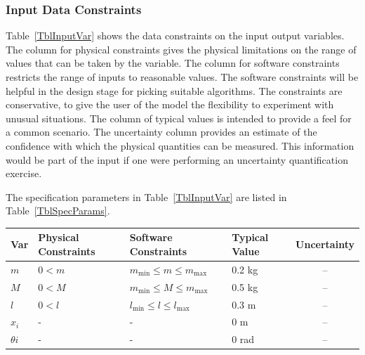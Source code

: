 \documentclass[12pt]{article}
\begin{document}



\subsubsection{Input Data Constraints} \label{sec_DataConstraints}    

Table~\ref{TblInputVar} shows the data constraints on the input output
variables.  The column for physical constraints gives the physical limitations
on the range of values that can be taken by the variable.  The column for
software constraints restricts the range of inputs to reasonable values.  The
software constraints will be helpful in the design stage for picking suitable
algorithms.  The constraints are conservative, to give the user of the model the
flexibility to experiment with unusual situations.  The column of typical values
is intended to provide a feel for a common scenario.  The uncertainty column
provides an estimate of the confidence with which the physical quantities can be
measured.  This information would be part of the input if one were performing an
uncertainty quantification exercise.

The specification parameters in Table~\ref{TblInputVar} are listed in
Table~\ref{TblSpecParams}.

\begin{table}[!h]
  \caption{Input Variables} \label{TblInputVar}
  \renewcommand{\arraystretch}{1}
\noindent \begin{longtable*}{l l l l c} 
  \toprule
  \textbf{Var} & \textbf{Physical Constraints} & \textbf{Software Constraints} &
                             \textbf{Typical Value} & \textbf{Uncertainty}\\
  \midrule 
  $m$ & $ 0< m$ & $m_{\text{min}} \leq m \leq m_{\text{max}}$ & 0.2 \si[per-mode=symbol] {\kilogram} & -- \\
  $M$ & $ 0<M $ & $m_{\text{min}} \leq M \leq m_{\text{max}}$ & 0.5 \si[per-mode=symbol] {\kilogram} & -- \\
  $l$ & $0<l $ & $l_{\text{min}} \leq l \leq l_{\text{max}}$ & 0.3 \si[per-mode=symbol] {\metre} &  --\\
  $x_i$ & - & - & 0 \si{\metre} & -- \\
  $\theta{i}$ & -  & - & 0 \si{\radian} & -- \\
  \bottomrule
\end{longtable*}
\end{table}
\end{document}
